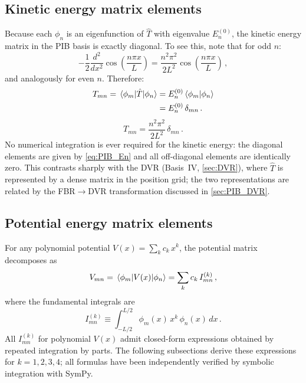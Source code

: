 \subsection{Kinetic energy matrix elements}\label{sec:PIB_T}

Because each $\phi_n$ is an eigenfunction of $\hat{T}$ with eigenvalue $E_n^{(0)}$,
the kinetic energy matrix in the PIB basis is exactly diagonal.  To see this, note
that for odd $n$:
\begin{equation}
  -\frac{1}{2}\frac{d^2}{dx^2}\cos\!\left(\frac{n\pi x}{L}\right)
  = \frac{n^2\pi^2}{2L^2}\cos\!\left(\frac{n\pi x}{L}\right)\,,
\end{equation}
and analogously for even $n$.  Therefore:
\begin{align}
  T_{mn} = \mel{\phi_m}{\hat{T}}{\phi_n}
  &= E_n^{(0)}\braket{\phi_m}{\phi_n}\notag\\
  &= E_n^{(0)}\,\delta_{mn}\,.
\end{align}
\begin{equation}\label{eq:PIB_T}
  \boxed{T_{mn} = \frac{n^2\pi^2}{2L^2}\,\delta_{mn}\,.}
\end{equation}
No numerical integration is ever required for the kinetic energy: the diagonal
elements are given by \cref{eq:PIB_En} and all off-diagonal elements are
identically zero.  This contrasts sharply with the DVR (Basis~IV, \cref{sec:DVR}),
where $\hat{T}$ is represented by a dense matrix in the position grid; the two
representations are related by the FBR$\to$DVR transformation discussed in
\cref{sec:PIB_DVR}.

\subsection{Potential energy matrix elements}\label{sec:PIB_V}

For any polynomial potential $V(x) = \sum_k c_k\,x^k$, the potential matrix
decomposes as
\begin{equation}
  V_{mn} = \mel{\phi_m}{V(x)}{\phi_n} = \sum_k c_k\,I_{mn}^{(k)}\,,
\end{equation}
where the fundamental integrals are
\begin{equation}\label{eq:PIB_Imn}
  I_{mn}^{(k)} \equiv \int_{-L/2}^{L/2}\phi_m(x)\,x^k\,\phi_n(x)\,dx\,.
\end{equation}
All $I_{mn}^{(k)}$ for polynomial $V(x)$ admit closed-form expressions obtained
by repeated integration by parts.  The following subsections derive these
expressions for $k = 1, 2, 3, 4$; all formulas have been independently verified
by symbolic integration with SymPy.

